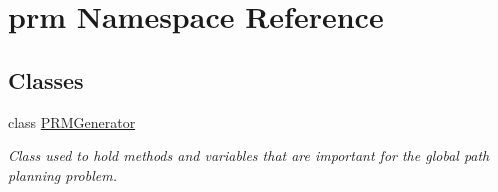 \hypertarget{namespaceprm}{\section{prm Namespace Reference}
\label{namespaceprm}
}
\subsection*{Classes}
\begin{DoxyCompactItemize}
\item 
class \hyperlink{classprm_1_1PRMGenerator}{P\-R\-M\-Generator}
\begin{DoxyCompactList}\small\item\em Class used to hold methods and variables that are important for the global path planning problem. \end{DoxyCompactList}\end{DoxyCompactItemize}
